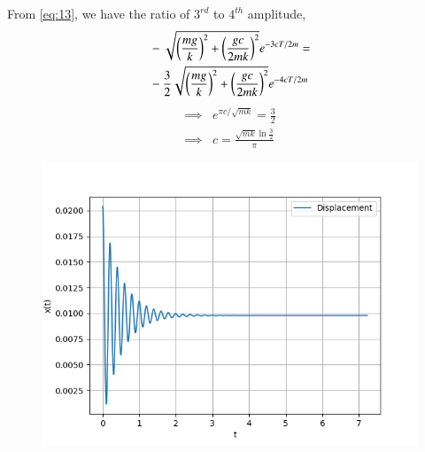 \documentclass[journal,12pt,twocolumn]{IEEEtran}
\theoremstyle{remark}
\begin{document}
    From \eqref{eq:13}, we have the ratio of $3^{rd}$ to $4^{th}$ amplitude,
    \begin{align}
        \begin{split}
            &-\sqrt{\brak{\frac{mg}{k}}^2+\brak{\frac{gc}{2mk}}^2}e^{-3cT/2m}= \\
            &-\frac{3}{2}\sqrt{\brak{\frac{mg}{k}}^2+\brak{\frac{gc}{2mk}}^2}e^{-4cT/2m} \label{eq:14}
        \end{split}
    \end{align}
    \begin{align}
        \implies &e^{\pi c/\sqrt{mk}}=\frac{3}{2} \label{eq:15}\\
        \implies &c=\frac{\sqrt{mk}\ln{\frac{3}{2}}}{\pi} \label{eq:16}
    \end{align}
\begin{figure}[h!]
    \centering
    \includegraphics[width=\columnwidth]{figs/fig2.png}
\end{figure}
\end{document}
